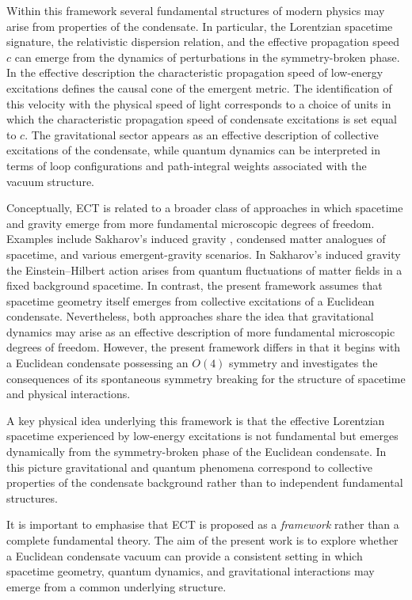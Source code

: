 \documentclass[11pt,a4paper]{article}
\numberwithin{equation}{section}
\begin{document}
Within this framework several fundamental structures of modern physics
may arise from properties of the condensate. In particular, the
Lorentzian spacetime signature, the relativistic dispersion relation,
and the effective propagation speed $c$ can emerge from the dynamics of
perturbations in the symmetry-broken phase. In the effective
description the characteristic propagation speed of low-energy
excitations defines the causal cone of the emergent metric. The identification of this velocity with the physical speed of light
corresponds to a choice of units in which the characteristic
propagation speed of condensate excitations is set equal to $c$. The gravitational sector
appears as an effective description of collective excitations of the
condensate, while quantum dynamics can be interpreted in terms of loop
configurations and path-integral weights associated with the vacuum
structure.

Conceptually, ECT is related to a broader class of approaches in which
spacetime and gravity emerge from more fundamental microscopic degrees
of freedom. Examples include Sakharov's induced gravity  \cite{Sakharov1968}, condensed
matter analogues of spacetime, and various emergent-gravity scenarios. In Sakharov's induced gravity the Einstein--Hilbert action arises from quantum fluctuations of matter fields in a fixed background spacetime.
In contrast, the present framework assumes that spacetime geometry
itself emerges from collective excitations of a Euclidean condensate.
Nevertheless, both approaches share the idea that gravitational
dynamics may arise as an effective description of more fundamental
microscopic degrees of freedom. However, the present framework differs in that it begins with a
Euclidean condensate possessing an $O(4)$ symmetry and investigates the
consequences of its spontaneous symmetry breaking for the structure of
spacetime and physical interactions.

A key physical idea underlying this framework is that the effective
Lorentzian spacetime experienced by low-energy excitations is not
fundamental but emerges dynamically from the symmetry-broken phase of
the Euclidean condensate. In this picture gravitational and quantum
phenomena correspond to collective properties of the condensate
background rather than to independent fundamental structures.

It is important to emphasise that ECT is proposed as a \emph{framework}
rather than a complete fundamental theory. The aim of the present work
is to explore whether a Euclidean condensate vacuum can provide a
consistent setting in which spacetime geometry, quantum dynamics, and
gravitational interactions may emerge from a common underlying
structure.
\end{document}
